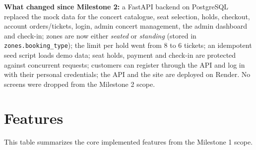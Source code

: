 \documentclass[11pt,a4paper]{article}
\newcommand{\code}[1]{\begingroup\let\codeus\_\renewcommand{\_}{\codeus\allowbreak}\texttt{#1}\endgroup}
\begin{document}
\textbf{What changed since Milestone 2:} a FastAPI backend on PostgreSQL replaced the mock data
for the concert catalogue, seat selection, holds, checkout, account orders/tickets, login, admin
concert management, the admin dashboard and check-in; zones are now either \emph{seated} or
\emph{standing} (stored in \code{zones.\allowbreak{}booking\_type}); the limit per hold went from 8 to 6 tickets;
an idempotent seed script loads demo data; seat holds, payment and check-in are protected against
concurrent requests; customers can register through the API and log in with their personal
credentials; the API and the site are deployed on Render.
No screens were dropped from the Milestone 2 scope.


\section{Features}
This table summarizes the core implemented features from the Milestone 1 scope.
\end{document}
